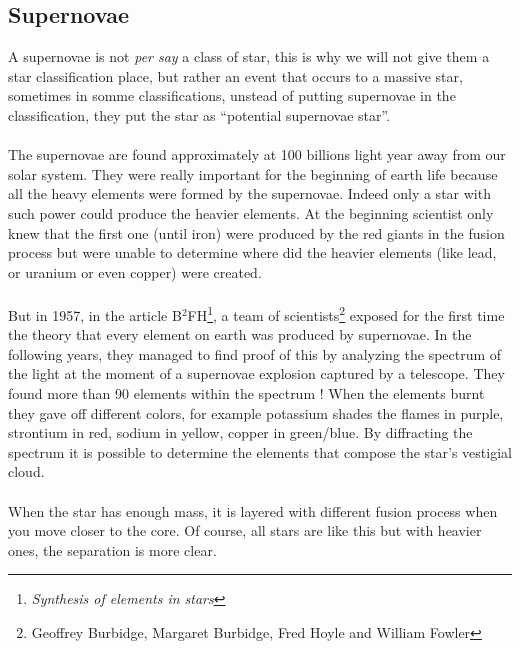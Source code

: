 \documentclass[a4paper, 11pt]{article} %
\begin{document}
\subsection{Supernovae}

A supernovae is not \textit{per say} a class of star, this is why we will not give them a star classification place, but rather an event that occurs to a massive star, sometimes in somme classifications, unstead of putting supernovae in the classification, they put the star as ``potential supernovae star''.

\paragraph*{}

The supernovae are found approximately at 100 billions light year away from our solar system. They were really important for the beginning of earth life because all the heavy elements were formed by the supernovae. Indeed only a star with such power could produce the heavier elements. At the beginning scientist only knew that the first one (until iron) were produced by the red giants in the fusion process but were unable to determine where did the heavier elements (like lead, or uranium or even copper) were created.

\paragraph*{}

 But in 1957, in the article B$^2$FH\footnote{\textit{Synthesis of elements in stars}}, a team of scientists\footnote{Geoffrey Burbidge, Margaret Burbidge, Fred Hoyle and William Fowler} exposed for the first time the theory that every element on earth was produced by supernovae. In the following years, they managed to find proof of this by analyzing the spectrum of the light at the moment of a supernovae explosion captured by a telescope. They found more than 90 elements within the spectrum ! When the elements burnt they gave off different colors, for example potassium shades the flames in purple, strontium in red, sodium in yellow, copper in green/blue. By diffracting the spectrum it is possible to determine the elements that compose the star's vestigial cloud.

\paragraph*{}
When the star has enough mass, it is layered with different fusion process when you move closer to the core. Of course, all stars are like this but with heavier ones, the separation is more clear.
\end{document}
